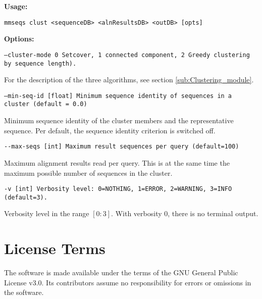 \documentclass[11pt,a4paper]{scrreprt}
\begin{document}
\textbf{Usage:}

\texttt{mmseqs clust <sequenceDB> <alnResultsDB> <outDB> {[}opts{]}}

\textbf{Options:}

\texttt{\small --cluster-mode 0 Setcover, 1 connected component, 2 Greedy clustering by sequence length).}{\small \par}

For the description of the three algorithms, see section \ref{sub:Clustering_module}.

\texttt{\small --min-seq-id {[}float{]} Minimum sequence identity of sequences in a cluster (default = 0.0)}{\small \par}

Minimum sequence identity of the cluster members and the representative sequence. Per default, the sequence identity criterion is switched off.

\texttt{\small -{}-max-seqs {[}int{]} Maximum result sequences per query (default=100)}{\small \par}

Maximum alignment results read per query. This is at the same time the maximum possible number of sequences in the cluster.

\texttt{\small -v {[}int{]} Verbosity level: 0=NOTHING, 1=ERROR, 2=WARNING, 3=INFO (default=3).}{\small \par}

Verbosity level in the range $[0:3]$. With verbosity $0$, there is no terminal output.


\section{License Terms}
The software is made available under the terms of the GNU General Public License v3.0. Its contributors assume no responsibility for errors or omissions in the software.
\end{document}
